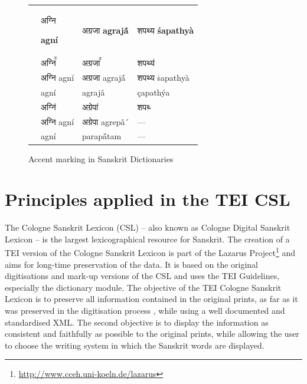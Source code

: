 \begin{figure}[!ht]
\begin{center}
\begingroup
\setlength{\tabcolsep}{10pt} %
\renewcommand{\arraystretch}{1.5} %
\begin{tabular}{llll}
  & \begin{devbfont}अग्नि\end{devbfont} {\bf agní}& {\devbfont अग्रजा} {\bf agrajā́} & {\devbfont शपथ्य} {\bf śapathyà}\\
 \citet{pwg} & {\devfont अग्नि꣫} & {\devfont अग्रजा꣫} & {\devfont शपथ्य॑}\\
 \citet{mw} & {\devfont अग्नि} agní & {\devfont अग्रजा} agrajā́ & {\devfont शपथ्य} ṡapathyà \\
 \citet{gra} & agní & agrajâ & çapathýa \\
 \citet{ccs,cae}  & {\devfont अग्नि॑} & {\devfont अग्रेपा॑} & {\devfont शपथ्य᳗}\\
\citet{md}  & {\devfont अग्नि} agní & {\devfont अग्रेपा} agrepâ´ & — \\
\citet{sch} & agní & parapā́tam & —
\end{tabular}
\endgroup
\end{center}
\caption[Accent marking in Sanskrit Dictionaries]{\label{tab:summary}Accent marking in Sanskrit Dictionaries}
\end{figure}

\chapter{Principles applied in the TEI CSL}

The Cologne Sanskrit Lexicon (CSL)\citep{markingMonier,KappMalten1997} – also known as Cologne Digital Sanskrit Lexicon – is the largest lexicographical resource for Sanskrit. The creation of a TEI version of the Cologne Sanskrit Lexicon is part of the Lazarus Project\footnote{\url{http://www.cceh.uni-koeln.de/lazarus}} and aims for long-time preservation of the data. It is based on the original digitisations and mark-up versions of the CSL and uses the TEI Guidelines, especially the dictionary module. The objective of the TEI Cologne Sanskrit Lexicon is to preserve all information contained in the original prints, as far as it was preserved in the digitisation process \citep[][as described in]{KappMalten1997}, while using a well documented and standardised XML. The second objective is to display the information as consistent and faithfully as possible to the original prints, while allowing the user to choose the writing system in which the Sanskrit words are displayed.

